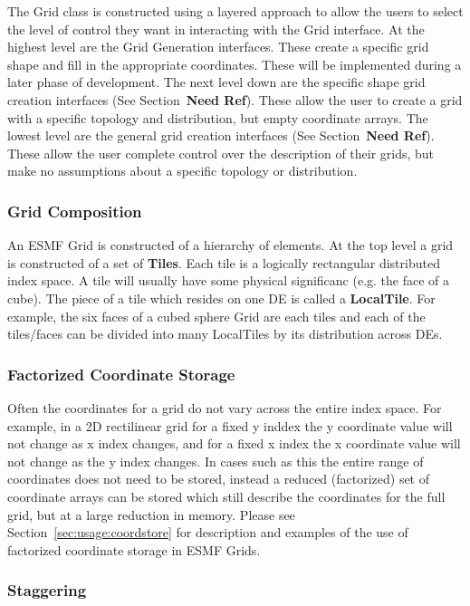The Grid class is constructed using a layered approach to allow the 
users to select the level of control they want in interacting with
the Grid interface. At the highest level are the Grid Generation interfaces. 
These create a specific grid shape and fill in the appropriate coordinates. 
These will be implemented during a later phase of development. The
next level down are the specific shape grid creation interfaces (See Section~\textbf{Need Ref}). 
These allow the user to create a grid with a specific topology and 
distribution, but empty coordinate arrays. The lowest level are
the general grid creation interfaces (See Section~\textbf{Need Ref}). These allow the user
complete control over the description of their grids, but
make no assumptions about a specific topology or distribution. 

\subsubsection{Grid Composition}\label{sec:gridcomp}
An ESMF Grid is constructed of a hierarchy of elements. At the top
level a grid is constructed of a set of {\bf Tiles}. Each tile is a logically
rectangular distributed index space. A tile will usually have some
physical significanc (e.g. the face of a cube). The piece of a tile
which resides on one DE is called a {\bf LocalTile}. For example, the six
faces of a cubed sphere Grid are each tiles and each of 
the tiles/faces can be divided into many LocalTiles by its
distribution across DEs. 

\subsubsection{Factorized Coordinate Storage}

Often the coordinates for a grid do not vary across the entire
index space. For example, in a 2D rectilinear grid for a fixed y
inddex the y coordinate value will not change as x index changes,
and for a fixed x index the x coordinate value will not change as the
y index changes. In cases such as this the entire range of 
coordinates does not need to be stored, instead a reduced
(factorized) set of coordinate arrays can be stored which 
still describe the coordinates for the full grid, but at a large reduction in 
memory. Please see Section~\ref{sec:usage:coordstore} for
description and examples of the use of factorized coordinate
storage in ESMF Grids. 


\subsubsection{Staggering}


